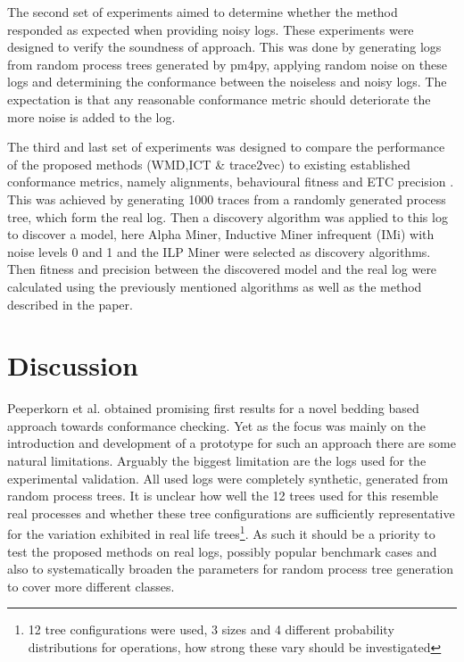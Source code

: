 \documentclass[runningheads]{template/llncs}
\begin{document}
The second set of experiments aimed to determine whether the method responded as expected when providing noisy logs.
These experiments were designed to verify the soundness of approach.
This was done by generating logs from random process trees generated by pm4py, applying random noise on these logs and determining the conformance between the noiseless and noisy logs.
The expectation is that any reasonable conformance metric should deteriorate the more noise is added to the log.

The third and last set of experiments was designed to compare the performance of the proposed methods (WMD,ICT \& trace2vec) to existing established conformance metrics, namely alignments, behavioural fitness \cite{GMVB09} and ETC precision \cite{MuCa10}.
This was achieved by generating 1000 traces from a randomly generated process tree, which form the real log.
Then a discovery algorithm was applied to this log to discover a model, here Alpha Miner, Inductive Miner infrequent (IMi) with noise levels 0 and 1 and the ILP Miner were selected as discovery algorithms.
Then fitness and precision between the discovered model and the real log were calculated using the previously mentioned algorithms as well as the method described in the paper.

\section{Discussion}

Peeperkorn et al. obtained promising first results for a novel bedding based approach towards conformance checking.
Yet as the focus was mainly on the introduction and development of a prototype for such an approach there are some natural limitations.
Arguably the biggest limitation are the logs used for the experimental validation.
All used logs were completely synthetic, generated from random process trees.
It is unclear how well the 12 trees used for this resemble real processes and whether these tree configurations are sufficiently representative for the variation exhibited in real life trees\footnote{12 tree configurations were used, 3 sizes and 4 different probability distributions for operations, how strong these vary should be investigated}.
As such it should be a priority to test the proposed methods on real logs, possibly popular benchmark cases and also to systematically broaden the parameters for random process tree generation to cover more different classes.

\end{document}
